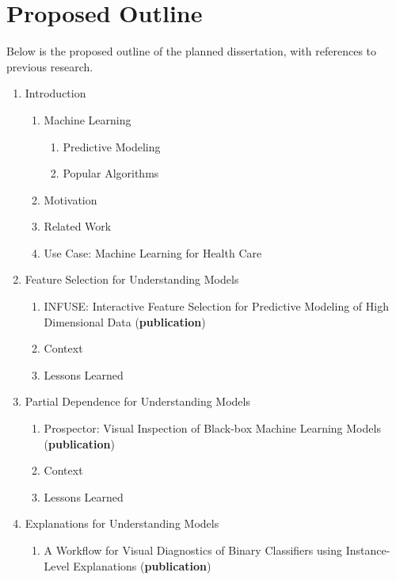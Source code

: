 \section{Proposed Outline}
Below is the proposed outline of the planned dissertation, with references to previous research.

\begin{enumerate}[label*=\arabic*.]
    \item Introduction
    \begin{enumerate}[label*=\arabic*.]
        \item Machine Learning
        \begin{enumerate}[label*=\arabic*.]
            \item Predictive Modeling
            \item Popular Algorithms
        \end{enumerate}
        \item Motivation
        \item Related Work
        \item Use Case: Machine Learning for Health Care
    \end{enumerate}
    \item Feature Selection for Understanding Models
    \begin{enumerate}[label*=\arabic*.]
        \item INFUSE: Interactive Feature Selection for Predictive Modeling of High Dimensional Data (\textbf{publication}) ~\cite{infuse}
        \item Context
        \item Lessons Learned
    \end{enumerate}
    \item Partial Dependence for Understanding Models
    \begin{enumerate}[label*=\arabic*.]
        \item Prospector: Visual Inspection of Black-box Machine Learning Models (\textbf{publication}) ~\cite{prospector16}
        \item Context
        \item Lessons Learned
    \end{enumerate}
    \item Explanations for Understanding Models
    \begin{enumerate}[label*=\arabic*.]
        \item A Workflow for Visual Diagnostics of Binary Classifiers using Instance-Level Explanations (\textbf{publication}) ~\cite{explainer}

\end{enumerate}
\end{enumerate}
